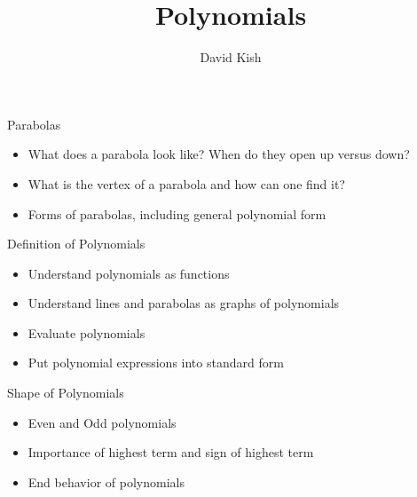 \documentclass{ximera}
\author{David Kish}
\title{Polynomials}
\begin{document}
\begin{abstract}
\end{abstract}
\maketitle


\begin{objectives}

\item Parabolas
\begin{itemize}
	\item What does a parabola look like?  When do they open up versus down?
	\item What is the vertex of a parabola and how can one find it?
	\item Forms of parabolas, including general polynomial form
\end{itemize}


\item Definition of Polynomials
\begin{itemize}
	\item Understand polynomials as functions
	\item Understand lines and parabolas as graphs of polynomials
	\item Evaluate polynomials
	\item Put polynomial expressions into standard form
\end{itemize}

\item Shape of Polynomials
\begin{itemize}
	\item Even and Odd polynomials
	\item Importance of highest term and sign of highest term  
	\item End behavior of polynomials 
\end{itemize}

\end{objectives}
\end{document}
